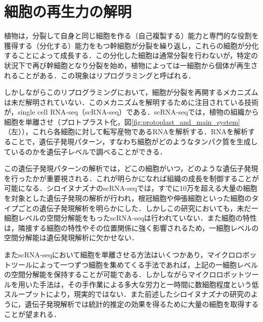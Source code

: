 \thispagestyle{fancy2}

\section{細胞の再生力の解明}
\label{sec:regeneration}

植物は，分裂して自身と同じ細胞を作る（自己複製する）能力と専門的な役割を獲得する（分化する）能力をもつ幹細胞が分裂を繰り返し，これらの細胞が分化することによって成長する\cite{sakamoto2022transcriptional}．この分化した細胞は通常分裂を行わないが，特定の状況下で再び幹細胞となり分裂を始め，植物によっては一細胞から個体が再生されることがある．この現象はリプログラミングと呼ばれる．

しかしながらこのリプログラミングにおいて，細胞が分裂を再開するメカニズムは未だ解明されていない．このメカニズムを解明するために注目されている技術が，single cell RNA-seq（scRNA-seq）\cite{kolodziejczyk2015technology}である．scRNA-seqでは，植物の組織から細胞を単離させ（プロトプラスト化\cite{pasternak2020single}，図\ref{fig:protoplast_and_main_system}（左）），これら各細胞に対して転写産物であるRNAを解析する．RNAを解析することで，遺伝子発現パターン，すなわち細胞がどのようなタンパク質を生成しているのかを遺伝子レベルで調べることができる\cite{xiao2012transcriptome,sakamoto2022transcriptional}．

この遺伝子発現パターンの解析では，どこの細胞がいつ，どのような遺伝子発現を行ったかが重要視される．これが明らかになれば組織の成長を制御することが可能になる．シロイヌナズナのscRNA-seq\cite{shahan2022single}では，すでに10万を超える大量の細胞を対象とした遺伝子発現の解析が行われ，根冠細胞や伸張細胞といった細胞のタイプごとの遺伝子発現解析を明らかにした．しかしこの研究においても，未だ一細胞レベルの空間分解能をもったscRNA-seqは行われていない．また細胞の特性は，隣接する細胞の特性やその位置関係に強く影響されるため，一細胞レベルの空間分解能は遺伝発現解析に欠かせない\cite{farhadifar2007influence}．

またscRNA-seqにおいて細胞を単離させる方法はいくつかあり\cite{kolodziejczyk2015technology}，マイクロロボットツールによって一つずつ細胞を集めてくる手法であれば，上記の一細胞レベルの空間分解能を保持することが可能である．しかしながらマイクロロボットツールを用いた手法は，その手作業による多大な労力と一時間に数細胞程度という低スループットにより，現実的ではない．また前述したシロイヌナズナの研究のように，遺伝子発現解析では統計的推定の効果を得るために大量の細胞を取得することが望まれる．

